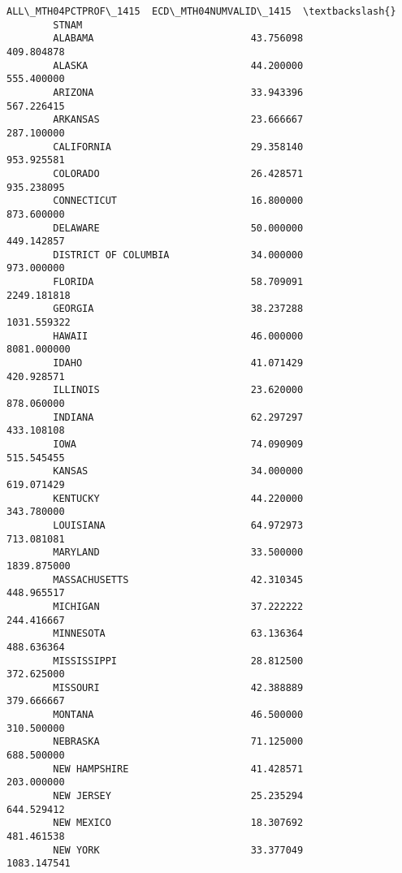 \documentclass[11pt]{article}
\begin{document}
\begin{Verbatim}[commandchars=\\\{\}]
                              ALL\_MTH04PCTPROF\_1415  ECD\_MTH04NUMVALID\_1415  \textbackslash{}
        STNAM                                                                 
        ALABAMA                           43.756098              409.804878   
        ALASKA                            44.200000              555.400000   
        ARIZONA                           33.943396              567.226415   
        ARKANSAS                          23.666667              287.100000   
        CALIFORNIA                        29.358140              953.925581   
        COLORADO                          26.428571              935.238095   
        CONNECTICUT                       16.800000              873.600000   
        DELAWARE                          50.000000              449.142857   
        DISTRICT OF COLUMBIA              34.000000              973.000000   
        FLORIDA                           58.709091             2249.181818   
        GEORGIA                           38.237288             1031.559322   
        HAWAII                            46.000000             8081.000000   
        IDAHO                             41.071429              420.928571   
        ILLINOIS                          23.620000              878.060000   
        INDIANA                           62.297297              433.108108   
        IOWA                              74.090909              515.545455   
        KANSAS                            34.000000              619.071429   
        KENTUCKY                          44.220000              343.780000   
        LOUISIANA                         64.972973              713.081081   
        MARYLAND                          33.500000             1839.875000   
        MASSACHUSETTS                     42.310345              448.965517   
        MICHIGAN                          37.222222              244.416667   
        MINNESOTA                         63.136364              488.636364   
        MISSISSIPPI                       28.812500              372.625000   
        MISSOURI                          42.388889              379.666667   
        MONTANA                           46.500000              310.500000   
        NEBRASKA                          71.125000              688.500000   
        NEW HAMPSHIRE                     41.428571              203.000000   
        NEW JERSEY                        25.235294              644.529412   
        NEW MEXICO                        18.307692              481.461538   
        NEW YORK                          33.377049             1083.147541   

\end{Verbatim}
\end{document}
